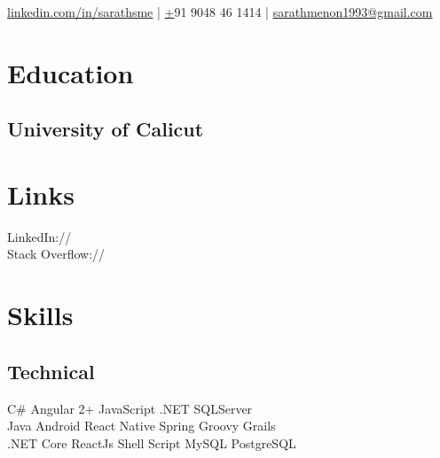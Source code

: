 \documentclass[]{deedy-resume-openfont}
\begin{document}
%
%
\lastupdated

%
%


{
    \href{https://www.linkedin.com/in/sarathsme}{linkedin.com/in/sarathsme} | 
    \href{tel:+919048461414} +91 9048 46 1414 | 
    \href{mailto:sarathmenon1993@gmail.com}{sarathmenon1993@gmail.com}
}

%
%

\begin{minipage}[t]{0.33\textwidth} 


\section{Education} 

\subsection{University of Calicut}
\sectionsep


\section{Links}
LinkedIn://  \href{https://www.linkedin.com/in/sarathsme}{} \\
Stack Overflow://  \href{https://stackoverflow.com/users/story/6498687}{}
\sectionsep


\section{Skills}
\subsection{Technical}
C\# \textbullet{} Angular 2+ \textbullet{} JavaScript \textbullet{} .NET \textbullet{} SQLServer \\ 
Java \textbullet{} Android \textbullet{} React Native  \textbullet{} Spring \textbullet{} Groovy \textbullet{} Grails \\
.NET Core \textbullet{} ReactJs \textbullet{} Shell Script \textbullet{} MySQL \textbullet{} PostgreSQL \\
\sectionsep


\end{minipage}
\end{document}
